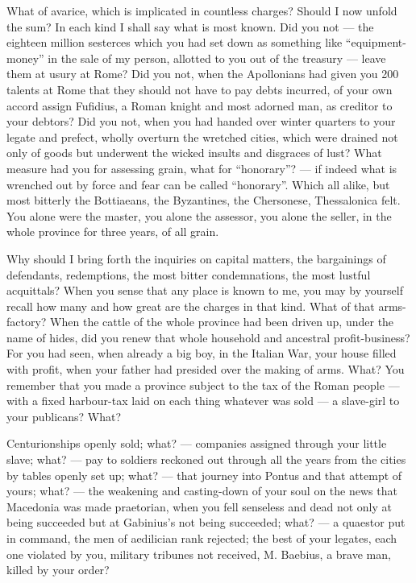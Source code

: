  What of avarice, which is implicated in countless charges? Should I now unfold the sum? In each kind I shall say what is most known. Did you not — the eighteen million sesterces which you had set down as something like ``equipment-money'' in the sale of my person, allotted to you out of the treasury — leave them at usury at Rome? Did you not, when the Apollonians had given you 200 talents at Rome that they should not have to pay debts incurred, of your own accord assign Fufidius, a Roman knight and most adorned man, as creditor to your debtors? Did you not, when you had handed over winter quarters to your legate and prefect, wholly overturn the wretched cities, which were drained not only of goods but underwent the wicked insults and disgraces of lust? What measure had you for assessing grain, what for ``honorary''? — if indeed what is wrenched out by force and fear can be called ``honorary''. Which all alike, but most bitterly the Bottiaeans, the Byzantines, the Chersonese, Thessalonica felt. You alone were the master, you alone the assessor, you alone the seller, in the whole province for three years, of all grain.

 Why should I bring forth the inquiries on capital matters, the bargainings of defendants, redemptions, the most bitter condemnations, the most lustful acquittals? When you sense that any place is known to me, you may by yourself recall how many and how great are the charges in that kind. What of that arms-factory? When the cattle of the whole province had been driven up, under the name of hides, did you renew that whole household and ancestral profit-business? For you had seen, when already a big boy, in the Italian War, your house filled with profit, when your father had presided over the making of arms. What? You remember that you made a province subject to the tax of the Roman people — with a fixed harbour-tax laid on each thing whatever was sold — a slave-girl to your publicans? What?

 Centurionships openly sold; what? — companies assigned through your little slave; what? — pay to soldiers reckoned out through all the years from the cities by tables openly set up; what? — that journey into Pontus and that attempt of yours; what? — the weakening and casting-down of your soul on the news that Macedonia was made praetorian, when you fell senseless and dead not only at being succeeded but at Gabinius's not being succeeded; what? — a quaestor put in command, the men of aedilician rank rejected; the best of your legates, each one violated by you, military tribunes not received, M. Baebius, a brave man, killed by your order?

